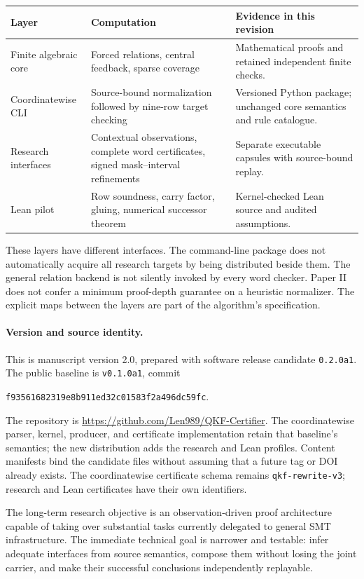 \begin{center}\small
\begin{tabularx}{\textwidth}{@{}l>{\raggedright\arraybackslash}X>{\raggedright\arraybackslash}X@{}}
\toprule
Layer & Computation & Evidence in this revision\\
\midrule
Finite algebraic core & Forced relations, central feedback, sparse coverage & Mathematical proofs and retained independent finite checks.\\
Coordinatewise CLI & Source-bound normalization followed by nine-row target checking & Versioned Python package; unchanged core semantics and rule catalogue.\\
Research interfaces & Contextual observations, complete word certificates, signed mask--interval refinements & Separate executable capsules with source-bound replay.\\
Lean pilot & Row soundness, carry factor, gluing, numerical successor theorem & Kernel-checked Lean source and audited assumptions.\\
\bottomrule
\end{tabularx}
\end{center}

These layers have different interfaces. The command-line package does not automatically acquire all research targets by being distributed beside them. The general relation backend is not silently invoked by every word checker. Paper II does not confer a minimum proof-depth guarantee on a heuristic normalizer. The explicit maps between the layers are part of the algorithm's specification.

\paragraph{Version and source identity.}
This is manuscript version 2.0, prepared with software release candidate \texttt{0.2.0a1}. The public baseline is \texttt{v0.1.0a1}, commit
\begin{center}\small\texttt{f93561682319e8b911ed32c01583f2a496dc59fc}.\end{center}
The repository is \url{https://github.com/Len989/QKF-Certifier}. The coordinatewise parser, kernel, producer, and certificate implementation retain that baseline's semantics; the new distribution adds the research and Lean profiles. Content manifests bind the candidate files without assuming that a future tag or DOI already exists. The coordinatewise certificate schema remains \texttt{qkf-rewrite-v3}; research and Lean certificates have their own identifiers.

The long-term research objective is an observation-driven proof architecture capable of taking over substantial tasks currently delegated to general SMT infrastructure. The immediate technical goal is narrower and testable: infer adequate interfaces from source semantics, compose them without losing the joint carrier, and make their successful conclusions independently replayable.
